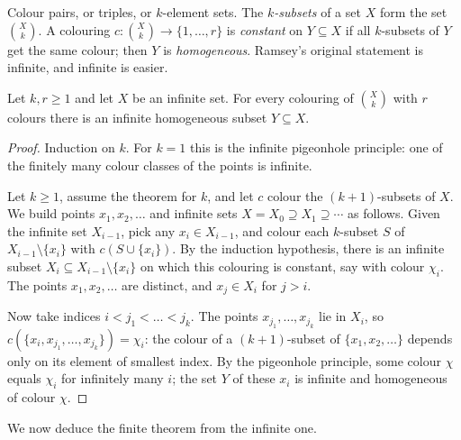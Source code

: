 Colour pairs, or triples, or $k$-element sets. The \emph{$k$-subsets} of a set $X$ form the set $\binom Xk$. A colouring $c:\binom Xk\to\{1,\dots,r\}$ is
\emph{constant} on $Y\subseteq X$ if all $k$-subsets of $Y$ get the same colour; then $Y$ is \emph{homogeneous}. Ramsey's original statement is infinite, and
infinite is easier.

\begin{theorem}[Ramsey, 1930]\label{extremal:thm:ramseyinf}
Let $k,r\ge1$ and let $X$ be an infinite set. For every colouring of $\binom Xk$ with $r$ colours there is an infinite homogeneous subset $Y\subseteq X$.
\end{theorem}
\begin{proof}
Induction on $k$. For $k=1$ this is the infinite pigeonhole principle: one of the finitely many colour classes of the points is infinite.

Let $k\ge1$, assume the theorem for $k$, and let $c$ colour the $(k+1)$-subsets of $X$. We build points $x_1,x_2,\ldots$ and infinite sets $X=X_0\supseteq X_1\supseteq\cdots$ as
follows. Given the infinite set $X_{i-1}$, pick any $x_i\in X_{i-1}$, and colour each $k$-subset $S$ of $X_{i-1}\setminus\{x_i\}$ with $c(S\cup\{x_i\})$. By the induction hypothesis,
there is an infinite subset $X_i\subseteq X_{i-1}\setminus\{x_i\}$ on which this colouring is constant, say with colour $\chi_i$. The points $x_1,x_2,\ldots$ are distinct, and
$x_j\in X_i$ for $j>i$.

Now take indices $i<j_1<\dots<j_k$. The points $x_{j_1},\dots,x_{j_k}$ lie in $X_i$, so $c(\{x_i,x_{j_1},\dots,x_{j_k}\})=\chi_i$: the colour of a $(k+1)$-subset of $\{x_1,x_2,\ldots\}$
depends only on its element of smallest index. By the pigeonhole principle, some colour $\chi$ equals $\chi_i$ for infinitely many $i$; the set $Y$ of these $x_i$ is
infinite and homogeneous of colour $\chi$.
\end{proof}

We now deduce the finite theorem from the infinite one.


